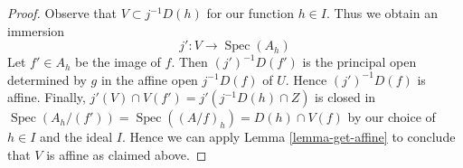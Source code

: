 \documentclass{stacks-project}
\theoremstyle{plain}
\theoremstyle{definition}
\theoremstyle{remark}
\numberwithin{equation}{subsection}
\def\Spec{\mathop{\mathrm{Spec}}}
\begin{document}
\begin{proof}
\medskip\noindent
Observe that $V \subset j^{-1}D(h)$ for our function $h \in I$.
Thus we obtain an immersion
$$
j' : V \longrightarrow \Spec(A_h)
$$
Let $f' \in A_h$ be the image of $f$. Then $(j')^{-1}D(f')$
is the principal open determined by $g$ in the affine
open $j^{-1}D(f)$ of $U$.
Hence $(j')^{-1}D(f)$ is affine. Finally,
$j'(V) \cap V(f') = j'(j^{-1}D(h) \cap Z)$
is closed in $\Spec(A_h/(f')) = \Spec((A/f)_h) = D(h) \cap V(f)$
by our choice of $h \in I$ and the ideal $I$. Hence we can apply
Lemma \ref{lemma-get-affine}
to conclude that $V$ is affine as claimed above.
\end{proof}
\end{document}

